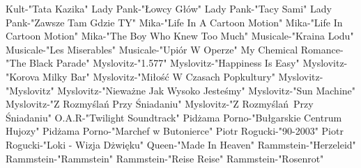 \documentclass{article}
\begin{document}
{ Kult-"Tata Kazika"   \newline
 Lady Pank-"Łowcy Głów"   \newline
 Lady Pank-"Tacy Sami"   \newline
 Lady Pank-"Zawsze Tam Gdzie TY"   \newline
 Mika-"Life In A Cartoon Motion"   \newline
 Mika-"Life In Cartoon Motion"   \newline
 Mika-"The Boy Who Knew Too Much"   \newline
 Musicale-"Kraina Lodu"   \newline
 Musicale-"Les Miserables"   \newline
 Musicale-"Upiór W Operze"   \newline
 My Chemical Romance-"The Black Parade"   \newline
 Myslovitz-"1.577"   \newline
 Myslovitz-"Happiness Is Easy"   \newline
 Myslovitz-"Korova Milky Bar"   \newline
 Myslovitz-"Miłość W Czasach Popkultury"   \newline
 Myslovitz-"Myslovitz"   \newline
 Myslovitz-"Nieważne Jak Wysoko Jesteśmy"   \newline
 Myslovitz-"Sun Machine"   \newline
 Myslovitz-"Z Rozmyślań Przy Śniadaniu"   \newline
 Myslovitz-"Z Rozmyślań Przy Śniadaniu"   \newline
 O.A.R-"Twilight Soundtrack"   \newline
 Pidżama Porno-"Bułgarskie Centrum Hujozy"   \newline
 Pidżama Porno-"Marchef w Butonierce"   \newline
 Piotr Rogucki-"90-2003"   \newline
 Piotr Rogucki-"Loki - Wizja Dżwięku"   \newline
 Queen-"Made In Heaven"   \newline
 Rammstein-"Herzeleid"   \newline
 Rammstein-"Rammstein"   \newline
 Rammstein-"Reise Reise"   \newline
 Rammstein-"Rosenrot"   \newline
}
\end{document}
